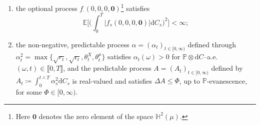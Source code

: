 \documentclass[10pt]{article} %
\newcommand{\vertiii}[1]{{\left\vert\kern-0.25ex\left\vert\kern-0.25ex\left\vert #1 \right\vert\kern-0.25ex\right\vert\kern-0.25ex\right\vert}}
\def \E{\mathbb{E}}
\def \H{\mathbb{H}}
\def \P{\mathbb{P}}
\def \R{\mathbb{R}}
\newcommand{\1}{\mathbf{1}}
\def\d{\mathrm{d}}
\begin{document}
\begin{enumerate}[{\bf(D1)}, leftmargin=0.9cm]
		\begin{equation*}
		\Omega \times [0,\infty) \ni (\omega,t) \longmapsto f_t(\omega,y,\mathrm{y},z,u_t(\omega; \cdot) ) \in \R,
	\end{equation*}
	is optional and $f$ is $(r,\theta^X,\theta^\mu)$--Lipschitz continuous on $\llbracket 0, T \rrbracket \coloneqq \{(\omega,t) \in \Omega \times [0,\infty) : t \leq T(\omega) \}$ in the sense that
			\begin{align*}
		\big|f_t(\omega,y,\mathrm{y},z,u_t(\omega; \cdot)) - f_t(\omega,y^\prime,\mathrm{y}^\prime,z^\prime,u_t^\prime(\omega; \cdot))\big|^2 
		&\leq r_t(\omega) |y-y^\prime|^2 + \mathrm{r}_t(\omega) |\mathrm{y}-\mathrm{y}^\prime|^2 \\
		&\quad + \theta^X_t(\omega) \|c_t^{1/2}(\omega)(z-z^\prime)\|^2 + \theta^\mu_t(\omega) \Big(\vertiii{u_t(\omega;\cdot) - u^\prime_t(\omega;\cdot)}_t(\omega) \Big)^2,
	\end{align*}
			for $\P \otimes \d C$--a.e. $(\omega,t) \in \llbracket 0, T \rrbracket$, where $r = (r_t)_{t \in [0,\infty)}$, $\mathrm{r} = (\mathrm{r}_t)_{t \in [0,\infty)}$, $\theta^X = (\theta^X_t)_{t \in [0,\infty)}$ and $\theta^\mu =(\theta^\mu_t)_{t \in [0,\infty)}$ are $[0,\infty)$-valued, predictable processes, and $c^{1/2}$ is the unique square-root matrix-valued process of $c$;\footnote{See \citeauthor*{horn2013matrix} \cite[page 439]{horn2013matrix}.}
		\item \label{data::integ_f0} the optional process $f_\cdot(0,0,0,\mathbf{0})$\footnote{Here $\mathbf{0}$ denotes the zero element of the space $\H^2(\mu)$.} satisfies
		\begin{equation*}
			\E \bigg[\bigg(\int_0^T |f_s(0,0,0,\mathbf{0})| \d C_s \bigg)^2 \bigg] < \infty;
		\end{equation*}
	\item \label{data::process_A} the non-negative, predictable process $\alpha = (\alpha_t)_{t \in [0,\infty)}$ defined through $\alpha^2_t = \max\{\sqrt{r_t},\sqrt{\mathrm{r}_t},\theta^X_t,\theta^\mu_t\}$ satisfies $\alpha_t(\omega) > 0$ for $\P \otimes \d C$--a.e. $(\omega,t) \in \llbracket 0,T\rrbracket$, and the predictable process $A = (A_t)_{t \in [0,\infty)}$ defined by $A_t \coloneqq \int_0^{t \land T} \alpha^2_s \d C_s$ is real-valued and satisfies $\Delta A \leq \Phi$, up to $\P$-evanescence, for some $\Phi \in [0,\infty)$.
\end{enumerate}
\end{document}
